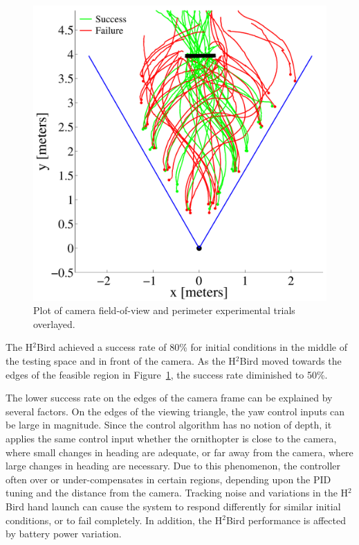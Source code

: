\documentclass{aamas2013}
\begin{document}
\begin{figure}[tb]
\begin{minipage}[b]{0.45\linewidth}
\includegraphics[width=\textwidth]{figures/flight_paths.pdf}
\caption{Plot of camera field-of-view and perimeter experimental trials overlayed.}
\label{fig:flight_paths}
\end{minipage}
\end{figure}

The H$^2$Bird achieved a success rate of 
80\% for initial conditions in the middle of the testing space and in front 
of the camera. As the H$^2$Bird moved towards the edges of the feasible region in 
Figure~\ref{fig:flight_paths}, the success rate diminished to 50\%.

The lower success rate on the edges of the camera frame can be explained by
several factors. On the edges of the viewing triangle, the yaw control inputs
can be large in magnitude. Since the
control algorithm has no notion of depth, it applies the same
control input whether the ornithopter is close to the camera, where small
changes in heading are adequate, or far away from the camera, where large
changes in heading are necessary. Due to this phenomenon, the controller often
over or under-compensates in certain regions, depending upon the PID tuning
and the distance from the camera. Tracking noise and variations in the
H$^2$Bird hand launch can cause the system to respond differently for similar
initial conditions, or to fail completely. In addition, the
H$^2$Bird performance is affected by battery power variation.
\end{document}
